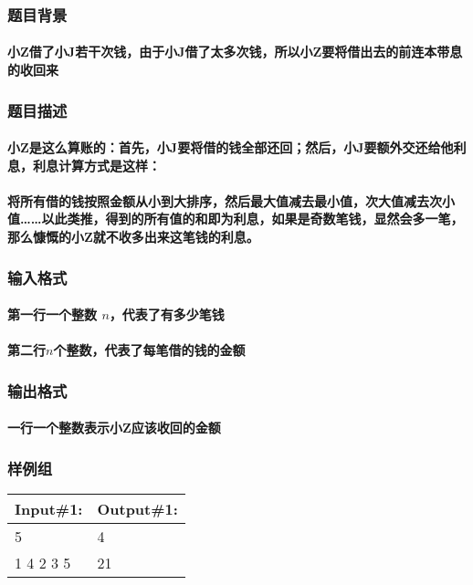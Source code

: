 \documentclass[final,11pt,oneside,UTF8]{report}
\begin{document}
\subsubsection{题目背景}
\paragraph{
    小Z借了小J若干次钱，由于小J借了太多次钱，所以小Z要将借出去的前连本带息的收回来
}
\subsubsection{题目描述}
\paragraph{
    小Z是这么算账的：首先，小J要将借的钱全部还回；然后，小J要额外交还给他利息，利息计算方式是这样：
}
\paragraph{
    将所有借的钱按照金额从小到大排序，然后最大值减去最小值，次大值减去次小值……以此类推，得到的所有值的和即为利息，如果是奇数笔钱，显然会多一笔，
    那么慷慨的小Z就不收多出来这笔钱的利息。
}
\subsubsection{输入格式}
\paragraph{第一行一个整数 $n$，代表了有多少笔钱}
\paragraph{第二行$n$个整数，代表了每笔借的钱的金额}
\subsubsection{输出格式}
\paragraph{一行一个整数表示小Z应该收回的金额}
\subsubsection{样例组}
\begin{table}[H]
    \begin{tabular}{|l|l|}
        \hline
        Input\#1: & Output\#1: \\ \hline
        5         & 4          \\
        1 4 2 3 5 & 21         \\ \hline
    \end{tabular}
\end{table}
\end{document}
